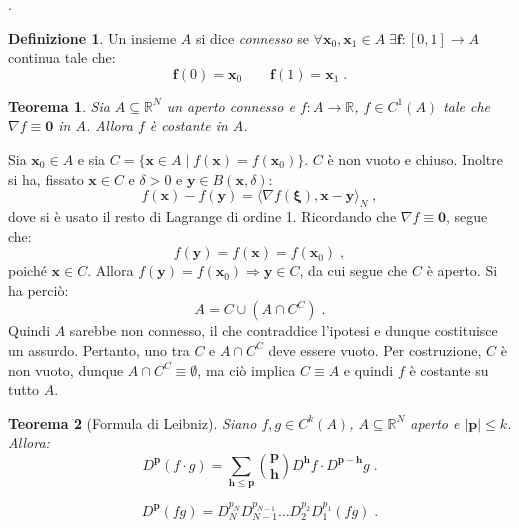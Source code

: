 \documentclass[a4paper,12pt]{report}
\theoremstyle{plain}
\newtheorem{thm}{Teorema}[section]
\theoremstyle{definition}
\newtheorem{defn}{Definizione}[section]
\theoremstyle{remark}
\newcommand{\BF}[1]{\boldsymbol{#1}}
\numberwithin{equation}{section}
\begin{document}
\proof [Basta scrivere il resto di Lagrange di $F(t)=f(\mathbf{x}_0+t\mathbf{v})$].
\endproof
\begin{defn} Un insieme $A$ si dice \textit{connesso} se $\forall \mathbf{x}_0,\mathbf{x}_1 \in A\; \exists \mathbf{f}:[0,1] \to A$ continua tale che:
\begin{equation}
\mathbf{f}(0)=\mathbf{x}_0 \qquad \mathbf{f}(1)=\mathbf{x}_1\;.
\end{equation}
\end{defn}
\begin{thm} Sia $A \subseteq \mathbb{R}^N$ un aperto connesso e $f:A \to \mathbb{R}$, $f \in C^1(A)$ tale che $\nabla f \equiv \mathbf{0}$ in $A$. Allora $f$ è costante in $A$.
\end{thm}
\proof Sia $\mathbf{x}_0 \in A$ e sia $C=\{\mathbf{x} \in A\;|\;f(\mathbf{x})=f(\mathbf{x}_0)\}$. $C$ è non vuoto e chiuso. Inoltre si ha, 
fissato $\mathbf{x} \in C$ e $\delta >0$ e $\mathbf{y} \in B(\mathbf{x},\delta)$:
\begin{equation}
f(\mathbf{x})-f(\mathbf{y})=\langle \nabla f(\BF{\xi}),\mathbf{x}-\mathbf{y}\rangle_N\;,
\end{equation}
dove si è usato il resto di Lagrange di ordine 1. Ricordando che $\nabla f \equiv \mathbf{0}$, segue che:
\begin{equation}
f(\mathbf{y})=f(\mathbf{x})=f(\mathbf{x}_0)\;,
\end{equation}
poiché $\mathbf{x} \in C$. Allora $f(\mathbf{y})=f(\mathbf{x}_0) \Longrightarrow \mathbf{y} \in C$, da cui segue che $C$ è aperto. Si ha 
perciò:
\begin{equation}
A=C \cup (A \cap C^C)\;.
\end{equation}
Quindi $A$ sarebbe non connesso, il che contraddice l'ipotesi e dunque costituisce un assurdo. Pertanto, uno tra $C$ e $A\cap C^C$ deve 
essere vuoto. Per costruzione, $C$ è non vuoto, dunque $A \cap C^C \equiv \emptyset$, ma ciò implica $C \equiv A$ e quindi $f$ è costante su tutto $A$.
\endproof
\begin{thm}[Formula di Leibniz] Siano $f,g \in C^k(A)$, $A \subseteq \mathbb{R}^N$ aperto e $|\mathbf{p}|\le k$. Allora:
\begin{equation}
D^{\mathbf{p}}(f \cdot g)=\sum_{\mathbf{h}\le\mathbf{p}} \binom{\mathbf{p}}{\mathbf{h}}D^{\mathbf{h}}f \cdot D^{\mathbf{p}-\mathbf{h}}g\;.
\end{equation}
\end{thm}
\proof 
\begin{equation}
D^{\mathbf{p}}(fg)=D_N^{p_N}D_{N-1}^{p_{N-1}} \ldots D_2^{p_2}D_1^{p_1}(fg)\;.
\end{equation}
\end{document}

